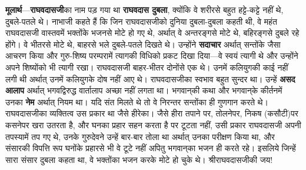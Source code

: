 \begin{sloppypar}\justifying{}
\textbf{मूलार्थ}—\textbf{राघवदासजी}का नाम पड़ गया था \textbf{राघवदास दुबला}, क्योंकि वे शरीरसे बहुत हट्टे-कट्टे नहीं थे, दुबले-पतले थे। नाभाजी कहते हैं कि जिन राघवदासजीको दुनिया दुबला-दुबला कहती थी, वे महंत राघवदासजी वास्तवमें भक्तोंके भजनसे मोटे हो गए थे, अर्थात् वे अन्तरङ्गसे मोटे थे, बहिरङ्गसे दुबले रहे होंगे। वे भीतरसे मोटे थे, बाहरसे भले दुबले-पतले दिखते थे। उन्होंने \textbf{सदाचार} अर्थात् सन्तोंके जैसा आचरण किया और गुरु-शिष्य परम्परामें त्यागकी विधिको प्रकट दिखा दिया—वे स्वयं त्यागी थे और उन्होंने अपने शिष्योंको भी त्यागी रखा। राघवदासजी बाहर-भीतर दोनोंसे एक थे। उनमें कलियुगकी काई नहीं लगी थी अर्थात् उनमें कलियुगके दोष नहीं आए थे। राघवदासजीका स्वभाव बहुत सुन्दर था। उन्हें \textbf{असद आलाप} अर्थात् भगवद्विरुद्ध वार्तालाप अच्छा नहीं लगता था। भगवान्‌की कथा और भगवान्‌के कीर्तनमें उनका \textbf{नेम} अर्थात् नियम था। यदि संत मिलते थे तो वे निरन्तर सन्तोंका ही गुणगान करते थे। राघवदासजीका व्यक्तित्व उस प्रकार था जैसे हीरेका। जैसे हीरा तपाने पर, तोलनेपर, निकष (कसौटी)पर कसनेपर खरा उतरता है, और घनका प्रहार सहन करता है पर टूटता नहीं, उसी प्रकार राघवदासजी अपनी तपस्यामें तप गए थे, उनके गुरुदेवने उन्हें बार-बार तोला था अर्थात् उनका परीक्षण किया था, और संसारकी विपत्ति रूप घनोंके प्रहारसे भी वे टूटे नहीं अपितु भगवान्‌का भजन ही करते रहे। इसलिये जिन्हें सारा संसार दुबला कहता था, वे भक्तोंका भजन करके मोटे हो चुके थे। श्रीराघवदासजीकी जय!
\end{sloppypar}


